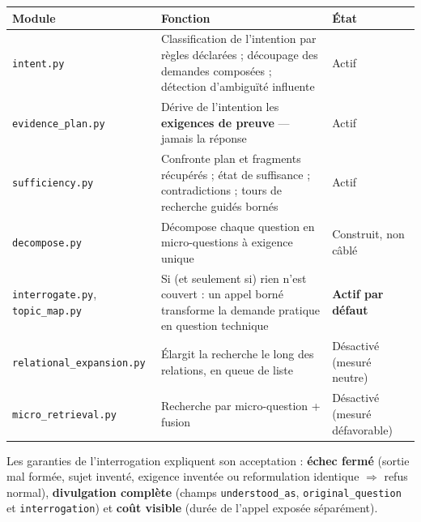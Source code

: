 \documentclass[a4paper,12pt]{report}
\begin{document}
\begin{table}[H]
\centering
\small
\begin{tabular}{p{4.3cm}p{7.7cm}p{2.5cm}}
\toprule
\textbf{Module} & \textbf{Fonction} & \textbf{État} \\
\midrule
\texttt{intent.py} & Classification de l'intention par règles déclarées ; découpage des demandes
composées ; détection d'ambiguïté influente & Actif \\
\texttt{evidence\_plan.py} & Dérive de l'intention les \textbf{exigences de preuve} — jamais la
réponse & Actif \\
\texttt{sufficiency.py} & Confronte plan et fragments récupérés ; état de suffisance ;
contradictions ; tours de recherche guidés bornés & Actif \\
\texttt{decompose.py} & Décompose chaque question en micro-questions à exigence unique & Construit,
non câblé \\
\texttt{interrogate.py}, \texttt{topic\_map.py} & Si (et seulement si) rien n'est couvert : un
appel borné transforme la demande pratique en question technique & \textbf{Actif par défaut} \\
\texttt{relational\_expansion.py} & Élargit la recherche le long des relations, en queue de liste &
Désactivé (mesuré neutre) \\
\texttt{micro\_retrieval.py} & Recherche par micro-question + fusion & Désactivé (mesuré
défavorable) \\
\bottomrule
\end{tabular}
\end{table}

Les garanties de l'interrogation expliquent son acceptation : \textbf{échec fermé} (sortie mal
formée, sujet inventé, exigence inventée ou reformulation identique $\Rightarrow$ refus normal),
\textbf{divulgation complète} (champs \texttt{understood\_as}, \texttt{original\_question} et
\texttt{interrogation}) et \textbf{coût visible} (durée de l'appel exposée séparément).
\end{document}
